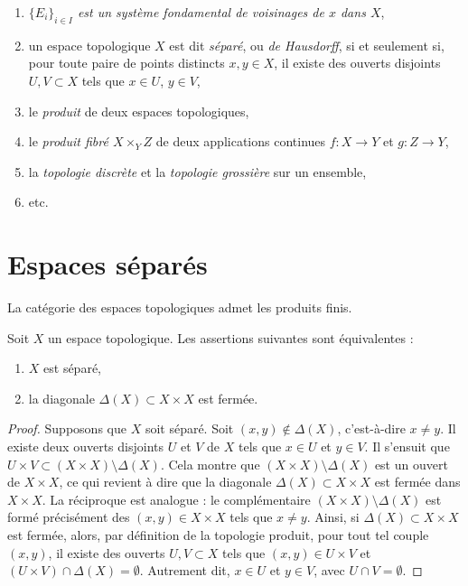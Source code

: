 \begin{enumerate}
$\mathcal{U} : U = \bigcup_{i \in I} U_i$, cela signifie que chaque $V_j$ est
contenu dans l'un des $U_i$),
\item
\label{item-fundamental-system}
{\it $\{ E_i \}_{i \in I}$ est un système fondamental de voisinages de $x$
dans $X$},
\item
\label{item-Hausdorff}
un espace topologique $X$ est dit {\it séparé}, ou {\it de Hausdorff}, si et
seulement si, pour toute paire de points distincts $x, y \in X$, il existe des
ouverts disjoints $U, V \subset X$ tels que $x \in U$, $y \in V$,
\item le {\it produit} de deux espaces topologiques,
\label{item-product}
\item
\label{item-fibre-product}
le {\it produit fibré $X \times_Y Z$} de deux applications continues
$f : X \to Y$ et $g : Z \to Y$,
\item
\label{item-discrete-indiscrete}
la {\it topologie discrète} et la {\it topologie grossière} sur un ensemble,
\item etc.
\end{enumerate}



\section{Espaces séparés}
\label{section-Hausdorff}

\noindent
La catégorie des espaces topologiques admet les produits finis.

\begin{lemma}
\label{lemma-Hausdorff}
Soit $X$ un espace topologique. Les assertions suivantes sont équivalentes :
\begin{enumerate}
\item $X$ est séparé,
\item la diagonale $\Delta(X) \subset X \times X$ est fermée.
\end{enumerate}
\end{lemma}

\begin{proof}
Supposons que $X$ soit séparé. Soit $(x, y) \not \in \Delta(X)$,
c'est-à-dire $x \neq y$. Il existe deux ouverts disjoints $U$ et $V$ de $X$
tels que $x \in U$ et $y \in V$. Il s'ensuit que $U \times V \subset
(X \times X) \setminus \Delta(X) $. Cela montre que $ (X \times X) \setminus
\Delta(X)$ est un ouvert de $ X \times X$, ce qui revient à dire que
la diagonale $\Delta(X) \subset X \times X$ est fermée dans $X \times X$.
La réciproque est analogue :
le complémentaire $(X \times X) \setminus \Delta(X)$ est formé
précisément des $(x, y) \in X\times X$ tels que $ x \neq y$. Ainsi, si
$ \Delta(X) \subset X \times X$ est fermée, alors, par définition de la
topologie produit, pour tout tel couple $ (x, y)$, il existe des ouverts
$U, V \subset X$ tels que $(x, y) \in U \times V$ et
$(U \times V)\cap \Delta(X) = \emptyset$. Autrement dit, $x \in U$ et
$y \in V$, avec $U \cap V = \emptyset$.
\end{proof}


